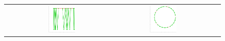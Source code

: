 \documentclass[11pt,a4paper]{book}
\newcommand{\wToy}{0.288}
\newcommand{\raiseToy}{+2.1cm}
\begin{document}
\begin{figure}[h!]
\begin{tabular}{rccc}
    \raisebox{\raiseToy}{(2)} &
    \includegraphics[width=\wToy\textwidth]{img-sgd/toy.10.a} &
    \includegraphics[width=\wToy\textwidth]{img-sgd/toy.10.m} &

\end{tabular}
\end{figure}
\end{document}
